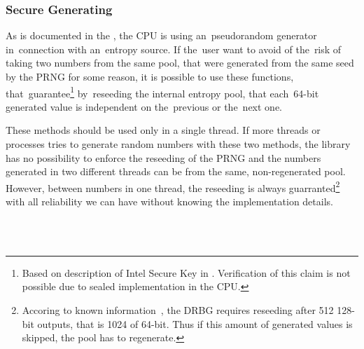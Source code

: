 \subsubsection{Secure Generating}\label{subsec:api:secure}
\par{
As is documented in the , the CPU is using an~pseudorandom generator in~connection with an~entropy source. If the~user want to avoid of the~risk of taking two numbers from the same pool, that were generated from the same seed by the PRNG for some reason, it is possible to use these functions, that~guarantee\footnote{Based on description of Intel Secure Key in . Verification of this claim is not possible due to sealed implementation in the CPU.} by~reseeding the internal entropy pool, that each~64-bit generated value is independent on the~previous or the~next one. 
}

\par{
These methods should be used only in a single thread. 
If more threads or processes tries to generate random numbers with these two methods, 
the library has no possibility to enforce the reseeding of the PRNG and the numbers generated 
in two different threads can be from the same, non-regenerated pool.
However, between numbers in one thread, 
the reseeding is always guarranted\footnote{Accoring to known information~\cite[sec.~2.4.2]{AnalysisOfDRNG}, the DRBG requires reseeding after 512 128-bit outputs, that is 1024 of 64-bit. 
Thus if this amount of generated values is skipped, the pool has to regenerate.} 
with all reliability we can have without knowing the implementation details.
}



\\


\\


